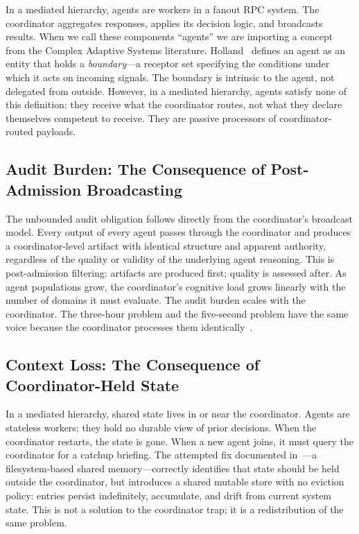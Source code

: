 \documentclass[11pt]{article}
\begin{document}
In a mediated hierarchy, agents are workers in a fanout RPC system. The
coordinator aggregates responses, applies its decision logic, and broadcasts
results. When we call these components ``agents'' we are importing a concept from
the Complex Adaptive Systems literature. Holland~\cite{holland} defines an agent
as an entity that holds a \emph{boundary}---a receptor set specifying the
conditions under which it acts on incoming signals. The boundary is intrinsic to
the agent, not delegated from outside. However, in a mediated hierarchy, agents satisfy
none of this definition: they receive what the coordinator routes, not what they
declare themselves competent to receive. They are passive processors of
coordinator-routed payloads.

\subsection{Audit Burden: The Consequence of Post-Admission Broadcasting}

The unbounded audit obligation follows directly from the coordinator's broadcast
model. Every output of every agent passes through the coordinator and produces a
coordinator-level artifact with identical structure and apparent authority,
regardless of the quality or validity of the underlying agent reasoning. This is
post-admission filtering: artifacts are produced first; quality is assessed after.
As agent populations grow, the coordinator's cognitive load grows linearly with
the number of domains it must evaluate. The audit burden scales with the
coordinator. The three-hour problem and the five-second problem have the same
voice because the coordinator processes them identically~\cite{signal-noise}.

\subsection{Context Loss: The Consequence of Coordinator-Held State}

In a mediated hierarchy, shared state lives in or near the coordinator. Agents are
stateless workers; they hold no durable view of prior decisions. When the
coordinator restarts, the state is gone. When a new agent joins, it must query the
coordinator for a catchup briefing. The attempted fix documented
in~\cite{context-problem}---a filesystem-based shared memory---correctly identifies
that state should be held outside the coordinator, but introduces a shared mutable
store with no eviction policy: entries persist indefinitely, accumulate, and drift
from current system state. This is not a solution to the coordinator trap; it is a
redistribution of the same problem.
\end{document}
